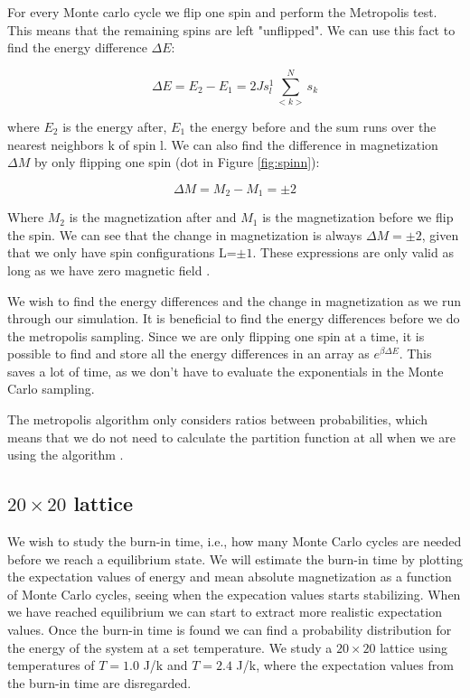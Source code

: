 \documentclass{article}
\begin{document}
\begin{multicols}{2}
For every Monte carlo cycle we flip one spin and perform the Metropolis test. This means that the remaining spins are left "unflipped". We can use this fact to find the energy difference $\Delta E$:

\begin{equation}
\Delta E = E_2 - E_1 =  2J s_l^1\sum_{<k>}^N s_k
\label{eq:dE}
\end{equation}

where $E_2$ is the energy after, $E_1$ the energy before and the sum runs  over the nearest neighbors k of spin l. We can also find the difference in magnetization $\Delta M$ by only flipping one spin (dot in Figure \ref{fig:spinn}):

\begin{equation}
\Delta M = M_2-M_1=\pm2
\label{eq:dM}
\end{equation}

Where $M_2$ is the magnetization after and $M_1$ is the magnetization before we flip the spin. We can see that the change in magnetization is always $\Delta M=\pm2$, given that we only have spin configurations L=$\pm1$. These expressions are only valid as long as we have zero magnetic field \cite{95}. 

We wish to find the energy differences and the change in magnetization as we run through our simulation. It is beneficial to find the energy differences before we do the metropolis sampling. Since we are only flipping one spin at a time, it is possible to find and store all the energy differences in an array as $e^{\beta\Delta E}$. This saves a lot of time, as we don't have to evaluate the exponentials in the Monte Carlo sampling. 

The metropolis algorithm only considers ratios between probabilities, which means that we do not need to calculate the partition function at all when we are using the algorithm \cite{94}. 

\subsection{$20 \times 20$ lattice}

We wish to study the burn-in time, i.e., how many Monte Carlo cycles are needed before we reach a equilibrium state. We will estimate the burn-in time by plotting the expectation values of energy and mean absolute magnetization as a function of Monte Carlo cycles, seeing when the expecation values starts stabilizing. When we have reached equilibrium we can start to extract more realistic expectation values. Once the burn-in time is found we can find a probability distribution for the energy of the system at a set temperature. We study a $20\times20$ lattice using temperatures of $T=1.0$ J/k and $T=2.4$ J/k, where the expectation values from the burn-in time are disregarded. 


\end{multicols}
\end{document}
